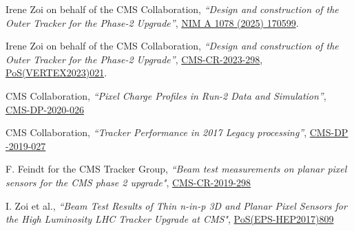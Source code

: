 \begin{refsection}
      \vspace{2mm}
      \onehalfspacing
Irene Zoi on behalf of the CMS Collaboration, {\sl ``Design and construction of the Outer Tracker for the Phase-2 Upgrade''},
\href{https://authors.elsevier.com/a/1l7wacPqbwV7W}{NIM A 1078 (2025) 170599}.
    \end{refsection}


\begin{refsection}
      \vspace{2mm}
      \onehalfspacing
Irene Zoi on behalf of the CMS Collaboration, {\sl ``Design and construction of the Outer Tracker for the Phase-2 Upgrade''},
\href{https://cds.cern.ch/record/2885850?ln=en}{CMS-CR-2023-298},
\href{https://doi.org/10.22323/1.448.0021}{PoS(VERTEX2023)021}.
    \end{refsection}

  
    \begin{refsection}
      \vspace{2mm}
      \onehalfspacing
CMS Collaboration, {\sl ``Pixel Charge Profiles in Run-2 Data and Simulation''},
\href{https://cds.cern.ch/record/2720551/files/DP2020_026.pdf}{CMS-DP-2020-026}
    \end{refsection}

      \begin{refsection}
      \vspace{2mm}
      \onehalfspacing
CMS Collaboration, {\sl ``Tracker Performance in 2017 Legacy processing''},
\href{http://cds.cern.ch/record/2689892/files/DP2019_027.pdf}{CMS-DP -2019-027}
    \end{refsection}


    \begin{refsection}
      \vspace{2mm}
      \onehalfspacing
       F. Feindt for the CMS Tracker Group, {\sl ``Beam test measurements on planar pixel sensors for the CMS phase 2 upgrade"}, \href{http://cds.cern.ch/record/2713732}{CMS-CR-2019-298}
    \end{refsection}
  


     
        \begin{refsection}
      \vspace{2mm}
      \onehalfspacing
      I. Zoi et al., {\sl ``Beam Test Results of Thin n-in-p 3D and Planar Pixel Sensors for the High Luminosity LHC Tracker Upgrade at CMS"}, \href{https://doi.org/10.22323/1.314.0809}{PoS(EPS-HEP2017)809}
    \end{refsection}


 
